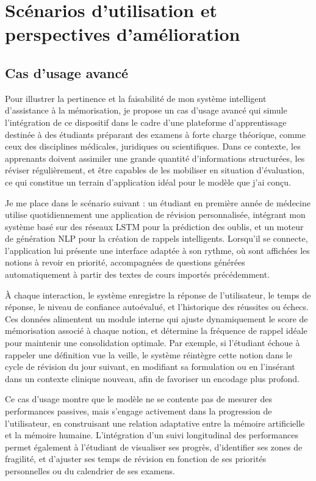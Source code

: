 \documentclass[11pt,a4paper]{report}
\begin{document}
\section{Scénarios d’utilisation et perspectives d’amélioration}

\subsection{Cas d’usage avancé}

Pour illustrer la pertinence et la faisabilité de mon système intelligent d’assistance à la mémorisation, je propose un cas d’usage avancé qui simule l’intégration de ce dispositif dans le cadre d’une plateforme d’apprentissage destinée à des étudiants préparant des examens à forte charge théorique, comme ceux des disciplines médicales, juridiques ou scientifiques. Dans ce contexte, les apprenants doivent assimiler une grande quantité d’informations structurées, les réviser régulièrement, et être capables de les mobiliser en situation d’évaluation, ce qui constitue un terrain d’application idéal pour le modèle que j’ai conçu.

Je me place dans le scénario suivant : un étudiant en première année de médecine utilise quotidiennement une application de révision personnalisée, intégrant mon système basé sur des réseaux LSTM pour la prédiction des oublis, et un moteur de génération NLP pour la création de rappels intelligents. Lorsqu’il se connecte, l’application lui présente une interface adaptée à son rythme, où sont affichées les notions à revoir en priorité, accompagnées de questions générées automatiquement à partir des textes de cours importés précédemment.

À chaque interaction, le système enregistre la réponse de l’utilisateur, le temps de réponse, le niveau de confiance autoévalué, et l’historique des réussites ou échecs. Ces données alimentent un module interne qui ajuste dynamiquement le score de mémorisation associé à chaque notion, et détermine la fréquence de rappel idéale pour maintenir une consolidation optimale. Par exemple, si l’étudiant échoue à rappeler une définition vue la veille, le système réintègre cette notion dans le cycle de révision du jour suivant, en modifiant sa formulation ou en l’insérant dans un contexte clinique nouveau, afin de favoriser un encodage plus profond.

Ce cas d’usage montre que le modèle ne se contente pas de mesurer des performances passives, mais s’engage activement dans la progression de l’utilisateur, en construisant une relation adaptative entre la mémoire artificielle et la mémoire humaine. L’intégration d’un suivi longitudinal des performances permet également à l’étudiant de visualiser ses progrès, d’identifier ses zones de fragilité, et d’ajuster ses temps de révision en fonction de ses priorités personnelles ou du calendrier de ses examens.
\end{document}
